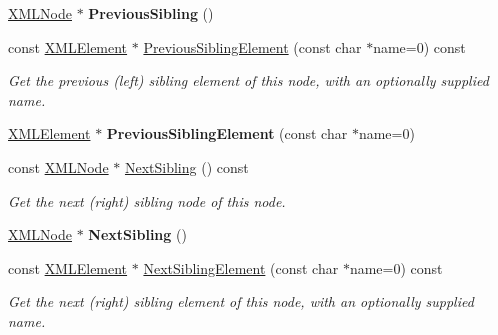 \begin{DoxyCompactItemize}
\mbox{\hyperlink{classtinyxml2_1_1_x_m_l_node}{X\+M\+L\+Node}} $\ast$ {\bfseries Previous\+Sibling} ()
\item 
\mbox{\label{classtinyxml2_1_1_x_m_l_node_a9453cda5e970375a7b1b2099f8a7c40a}} 
const \mbox{\hyperlink{classtinyxml2_1_1_x_m_l_element}{X\+M\+L\+Element}} $\ast$ \mbox{\hyperlink{classtinyxml2_1_1_x_m_l_node_a9453cda5e970375a7b1b2099f8a7c40a}{Previous\+Sibling\+Element}} (const char $\ast$name=0) const
\begin{DoxyCompactList}\small\item\em Get the previous (left) sibling element of this node, with an optionally supplied name. \end{DoxyCompactList}\item 
\mbox{\label{classtinyxml2_1_1_x_m_l_node_ae4f37eb6cd405bdf1d57caa066e36d87}} 
\mbox{\hyperlink{classtinyxml2_1_1_x_m_l_element}{X\+M\+L\+Element}} $\ast$ {\bfseries Previous\+Sibling\+Element} (const char $\ast$name=0)
\item 
\mbox{\label{classtinyxml2_1_1_x_m_l_node_a79db9ef0fe014d27790f2218b87bcbb5}} 
const \mbox{\hyperlink{classtinyxml2_1_1_x_m_l_node}{X\+M\+L\+Node}} $\ast$ \mbox{\hyperlink{classtinyxml2_1_1_x_m_l_node_a79db9ef0fe014d27790f2218b87bcbb5}{Next\+Sibling}} () const
\begin{DoxyCompactList}\small\item\em Get the next (right) sibling node of this node. \end{DoxyCompactList}\item 
\mbox{\label{classtinyxml2_1_1_x_m_l_node_aeb7d4dfd8fb924ef86e7cb72183acbac}} 
\mbox{\hyperlink{classtinyxml2_1_1_x_m_l_node}{X\+M\+L\+Node}} $\ast$ {\bfseries Next\+Sibling} ()
\item 
\mbox{\label{classtinyxml2_1_1_x_m_l_node_a14ea560df31110ff07a9f566171bf797}} 
const \mbox{\hyperlink{classtinyxml2_1_1_x_m_l_element}{X\+M\+L\+Element}} $\ast$ \mbox{\hyperlink{classtinyxml2_1_1_x_m_l_node_a14ea560df31110ff07a9f566171bf797}{Next\+Sibling\+Element}} (const char $\ast$name=0) const
\begin{DoxyCompactList}\small\item\em Get the next (right) sibling element of this node, with an optionally supplied name. \end{DoxyCompactList}\item 

\end{DoxyCompactItemize}
